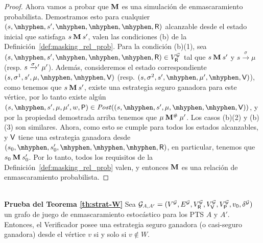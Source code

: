 \begin{proof}
Ahora vamos a probar que $\mathbin{\mathbf{M}}$ es una simulación de enmascaramiento probabilista. Demostramos esto para cualquier $(s,\mhyphen,s',\mhyphen, \mhyphen,  \mhyphen, \Refuter)$ alcanzable desde el estado inicial que satisfaga $s \mathbin{\mathbf{M}} s'$, valen las condiciones (b) de la Definición~\ref{def:masking_rel_prob}.  Para la condición (b)(1), sea $(s,\mhyphen,s',\mhyphen, \mhyphen,  \mhyphen, \Refuter) \in V^{\StochG}_\Refuter$ tal que 
$s \mathbin{\mathbf{M}} s'$ y $s \xrightarrow{\sigma} \mu$ (resp. $s \mathrel{{\xrightarrow[]{\sigma}}{}'} \mu'$). Además, consideremos el estado correspondiente 
$(s,\sigma^1,s', \mu, \mhyphen, \mhyphen, \Verifier)$ (resp.  $(s,\sigma^2,s',  \mhyphen, \mu', \mhyphen, \Verifier)$),  como tenemos que $s \mathbin{\mathbf{M}} s'$, existe una estrategia seguro ganadora para este vértice, por lo tanto existe algún 
$(s,\mhyphen,s', \mu,  \mu', w,\Probabilistic) \in \post((s,\mhyphen,s', \mu, \mhyphen, \mhyphen, \Verifier))$, y por la propiedad demostrada arriba tenemos que 
$\mu \mathbin{\mathbf{M^{\#}}} \mu'$. Los casos (b)(2) y (b)(3) son similares.  Ahora, como esto se cumple para todos los estados alcanzables, y 
$\mathsf{V}$ tiene una estrategia ganadora desde $(s_0, \mhyphen, s'_0, \mhyphen, \mhyphen,  \mhyphen, \Refuter)$, en particular, tenemos que $s_0 \mathbin{\mathbf{M}} s'_0$. 
Por lo tanto, todos los requisitos de la Definición~\ref{def:masking_rel_prob} valen, y entonces $\mathbin{\mathbf{M}}$ es una relación de enmascaramiento probabilista. 
\end{proof} \\











\noindent
\textbf{Prueba del Teorema \ref{th:strat-W}}
  Sea
  $\mathcal{G}_{A,A'} = (V^{\mathcal{G}}, E^{\mathcal{G}}, V^{\mathcal{G}}_{\mathsf{R}}, V^{\mathcal{G}}_{\mathsf{V}}, V^{\mathcal{G}}_{\mathsf{P}}, v_0, \delta^{\mathcal{G}})$
  un grafo de juego de enmascaramiento estocástico para los PTS $A$ y $A'$.  Entonces, el
  Verificador posee una estrategia seguro ganadora (o casi-seguro ganadora) desde el vértice $v$ si y solo si
  $v \notin W$.
\noindent \\

